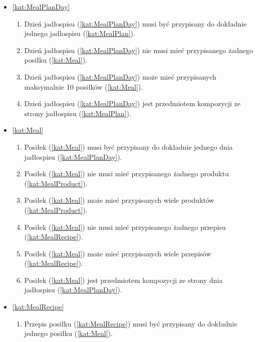 \begin{itemize}[label={\textbf{Reguły dla}}, wide, labelwidth=!, labelindent=0pt]
    \item\ref{kat:MealPlanDay}\mynobreakpar
    \begin{enumerate}[label={\textbf{REG/4/\protect\twodigits{\arabic{enumi}}}}, wide, labelwidth=!, align=left, leftmargin=3cm, resume]
        \item Dzień jadłospisu (\ref{kat:MealPlanDay}) musi być przypisany do dokładnie jednego jadłospisu (\ref{kat:MealPlan}).
        \item Dzień jadłospisu (\ref{kat:MealPlanDay}) nie musi mieć przypisanego żadnego posiłku (\ref{kat:Meal}).
        \item Dzień jadłospisu (\ref{kat:MealPlanDay}) może mieć przypisanych maksymalnie 10 posiłków (\ref{kat:Meal}).
        \item Dzień jadłospisu (\ref{kat:MealPlanDay}) jest przedmiotem kompozycji ze strony jadłospisu (\ref{kat:MealPlan}).
    \end{enumerate}
    \item\ref{kat:Meal}\mynobreakpar
    \begin{enumerate}[label={\textbf{REG/4/\protect\twodigits{\arabic{enumi}}}}, wide, labelwidth=!, align=left, leftmargin=3cm, resume]
        \item Posiłek (\ref{kat:Meal}) musi być przypisany do dokładnie jednego dnia jadłospisu (\ref{kat:MealPlanDay}).
        \item Posiłek (\ref{kat:Meal}) nie musi mieć przypisanego żadnego produktu (\ref{kat:MealProduct}).
        \item Posiłek (\ref{kat:Meal}) może mieć przypisanych wiele produktów (\ref{kat:MealProduct}).
        \item Posiłek (\ref{kat:Meal}) nie musi mieć przypisanego żadnego przepisu (\ref{kat:MealRecipe}).
        \item Posiłek (\ref{kat:Meal}) może mieć przypisanych wiele przepisów (\ref{kat:MealRecipe}).
        \item Posiłek (\ref{kat:Meal}) jest przedmiotem kompozycji ze strony dnia jadłospisu (\ref{kat:MealPlanDay}).
    \end{enumerate}
    \item\ref{kat:MealRecipe}\mynobreakpar
    \begin{enumerate}[label={\textbf{REG/4/\protect\twodigits{\arabic{enumi}}}}, wide, labelwidth=!, align=left, leftmargin=3cm, resume]
        \item Przepis posiłku (\ref{kat:MealRecipe}) musi być przypisany do dokładnie jednego posiłku (\ref{kat:Meal}).

\end{enumerate}
\end{itemize}

